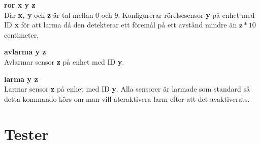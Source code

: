 \documentclass{article}
\begin{document}
    \textbf{ror x y z}\\
    Där \textbf{x, y} och \textbf{z} är tal mellan 0 och 9. Konfigurerar rörelsesensor \textbf{y} på enhet med ID \textbf{x} för att larma då den detekterar ett föremål på ett avstånd mindre än \(\textbf{z} * 10\) centimeter.

    \textbf{avlarma y z} \\
    Avlarmar sensor \textbf{z} på enhet med ID \textbf{y}.

    \textbf{larma y z} \\
    Larmar sensor \textbf{z} på enhet med ID \textbf{y}. Alla sensorer är larmade som standard så detta kommando körs om man vill återaktivera larm efter att det avaktiverats.

	\clearpage
	\section{Tester}
    		\label{bilaga:tester}
     	
	
	
	
         
         
         
         
         
         
	
\end{document}
